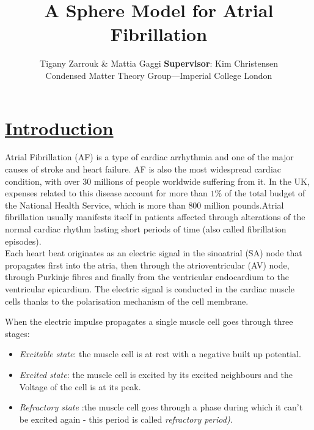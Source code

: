 \documentclass[twocolumn, a1paper, 12pt]{article}
\begin{document}
\title {\textbf{ A Sphere Model for Atrial Fibrillation}}
\author{Tigany Zarrouk \& Mattia Gaggi \textbf{Supervisor}: Kim Christensen \\ Condensed Matter Theory Group---Imperial College London}

\date{}
\maketitle






\section{\textbf{\underline{Introduction}}}

Atrial Fibrillation (AF) is a type of cardiac arrhythmia and one of the major causes of stroke and heart failure. AF is also the most widespread cardiac condition, with over 30 millions of people worldwide suffering from it. In the UK, expenses related to this disease account for more than $1\%$ of the total budget of the National Health Service, which is more than $800$ million pounds.Atrial fibrillation usually manifests itself in patients affected through alterations of the normal cardiac rhythm lasting short periods of time (also called fibrillation episodes).\\

Each heart beat originates as an electric signal in the sinoatrial (SA) node that propagates first into the atria, then through the atrioventricular (AV) node, through Purkinje fibres and finally from the ventricular endocardium to the ventricular epicardium. The electric signal is conducted in the cardiac muscle cells thanks to the polarisation mechanism of the cell membrane. 






When the electric impulse propagates a single muscle cell goes through three stages:

\begin{itemize}
  \item \textit{Excitable state}: the muscle cell is at rest with a negative built up potential.
  										
  \item \textit{Excited state}: the muscle cell is excited by its excited neighbours and the Voltage of the cell is at its peak. 
  \item \textit{Refractory state} :the muscle cell goes through a phase during which it can't be excited again - this period is called \textit{refractory period)}.
\end{itemize}  
\end{document}
